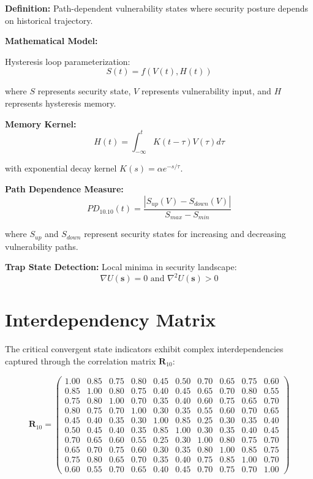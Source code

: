 \documentclass[11pt,a4paper]{article}
\begin{document}
\textbf{Definition:} Path-dependent vulnerability states where security posture depends on historical trajectory.

\textbf{Mathematical Model:}

Hysteresis loop parameterization:
\begin{equation}
S(t) = f(V(t), H(t))
\end{equation}

where $S$ represents security state, $V$ represents vulnerability input, and $H$ represents hysteresis memory.

\textbf{Memory Kernel:}
\begin{equation}
H(t) = \int_{-\infty}^{t} K(t-\tau) V(\tau) d\tau
\end{equation}

with exponential decay kernel $K(s) = \alpha e^{-s/\tau}$.

\textbf{Path Dependence Measure:}
\begin{equation}
PD_{10.10}(t) = \frac{|S_{up}(V) - S_{down}(V)|}{S_{max} - S_{min}}
\end{equation}

where $S_{up}$ and $S_{down}$ represent security states for increasing and decreasing vulnerability paths.

\textbf{Trap State Detection:}
Local minima in security landscape:
\begin{equation}
\nabla U(\mathbf{s}) = 0 \text{ and } \nabla^2 U(\mathbf{s}) > 0
\end{equation}

\section{Interdependency Matrix}

The critical convergent state indicators exhibit complex interdependencies captured through the correlation matrix $\mathbf{R}_{10}$:

\begin{equation}
\mathbf{R}_{10} = \begin{pmatrix}
1.00 & 0.85 & 0.75 & 0.80 & 0.45 & 0.50 & 0.70 & 0.65 & 0.75 & 0.60 \\
0.85 & 1.00 & 0.80 & 0.75 & 0.40 & 0.45 & 0.65 & 0.70 & 0.80 & 0.55 \\
0.75 & 0.80 & 1.00 & 0.70 & 0.35 & 0.40 & 0.60 & 0.75 & 0.65 & 0.70 \\
0.80 & 0.75 & 0.70 & 1.00 & 0.30 & 0.35 & 0.55 & 0.60 & 0.70 & 0.65 \\
0.45 & 0.40 & 0.35 & 0.30 & 1.00 & 0.85 & 0.25 & 0.30 & 0.35 & 0.40 \\
0.50 & 0.45 & 0.40 & 0.35 & 0.85 & 1.00 & 0.30 & 0.35 & 0.40 & 0.45 \\
0.70 & 0.65 & 0.60 & 0.55 & 0.25 & 0.30 & 1.00 & 0.80 & 0.75 & 0.70 \\
0.65 & 0.70 & 0.75 & 0.60 & 0.30 & 0.35 & 0.80 & 1.00 & 0.85 & 0.75 \\
0.75 & 0.80 & 0.65 & 0.70 & 0.35 & 0.40 & 0.75 & 0.85 & 1.00 & 0.70 \\
0.60 & 0.55 & 0.70 & 0.65 & 0.40 & 0.45 & 0.70 & 0.75 & 0.70 & 1.00
\end{pmatrix}
\end{equation}
\end{document}
